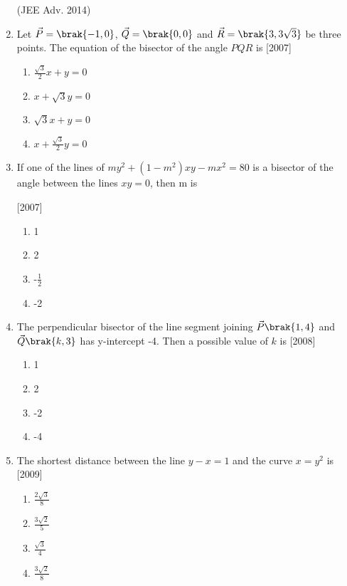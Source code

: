 \begin{enumerate}
		\hfill{(JEE Adv. 2014)}
	\item Let $\vec{P}=\brak{-1, 0}$, $\vec{Q}=\brak{0, 0}$ and $\vec{R}=\brak{3, 3\sqrt{3}}$ be three points. The equation of the bisector of the angle $PQR$ is \hfill{[2007]}
\begin{multicols}{2}
\begin{enumerate}
\item $\frac{\sqrt{3}}{2}x+y=0$
\item $x+\sqrt{3}y=0$
\item $\sqrt{3}x+y=0$
\item $x+\frac{\sqrt{3}}{2}y=0$
\end{enumerate}
\end{multicols}

\item If one of the lines of $my^{2}+(1-m^{2})xy-mx^{2}=80$ is a bisector 
of the angle between the lines $xy=0$, then m is

\hfill{[2007]}
\begin{multicols}{4}
\begin{enumerate}
\item 1
\item 2
\item -$\frac{1}{2}$
\item -2
\end{enumerate}
\end{multicols}

\item The perpendicular bisector of the line segment joining $\vec{P}\brak{1,4}$ and $\vec{Q}\brak{k, 3}$ has y-intercept -4. Then a possible value of $k$ is \hfill{[2008]}
\begin{multicols}{4}
\begin{enumerate}
\item 1
\item 2
\item -2
\item -4
\end{enumerate}
\end{multicols} 

\item The shortest distance between the line $y- x =1$ and the 
curve $x=y^{2}$ is \hfill{[2009]}
\begin{multicols}{4}
\begin{enumerate}
\item $\frac{2\sqrt{3}}{8}$
\item $\frac{3\sqrt{2}}{5}$
\item $\frac{\sqrt{3}}{4}$
\item $\frac{3\sqrt{2}}{8}$
\end{enumerate}
\end{multicols}


\end{enumerate}
